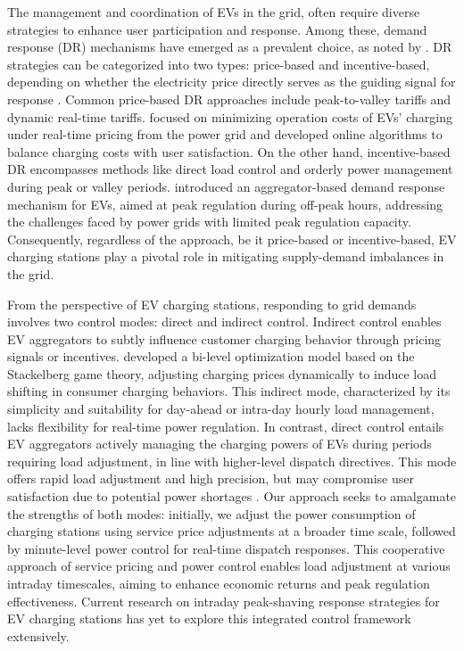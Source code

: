 \documentclass[preprint,12pt]{elsarticle}
\begin{document}
The management and coordination of  EVs in the grid, often require diverse strategies to enhance user participation and response. Among these, demand response (DR) mechanisms have emerged
as a prevalent choice, as noted by \citet{Mohandes_Demand_Response}. DR strategies can be categorized into two types: price-based and incentive-based, depending on whether the electricity price directly serves as the guiding signal for response \citep{FANShuai2022}. Common price-based
DR approaches include peak-to-valley tariffs and dynamic real-time tariffs. \citet{lin_minimizing_2022} focused on minimizing operation costs of EVs' charging under real-time pricing from the power grid and developed online algorithms to balance charging
costs with user satisfaction. On the other hand, incentive-based DR encompasses methods like direct load control and orderly power management during peak or valley periods. \citet{fang_aggregator-based_2020} introduced an aggregator-based demand response mechanism for EVs, aimed at peak regulation during off-peak hours, addressing the challenges faced by power grids with limited peak regulation capacity. Consequently, regardless of the approach, be it price-based or incentive-based,
EV charging stations play a pivotal role in mitigating supply-demand imbalances in the grid.

From the perspective of EV charging stations, responding to grid demands
involves two control modes: direct and indirect control. Indirect
control enables EV aggregators to subtly influence customer charging
behavior through pricing signals or incentives. \citet{2021A} developed a bi-level optimization model based on the Stackelberg game theory, adjusting charging prices dynamically to induce load shifting in consumer charging behaviors. This indirect mode, characterized by its simplicity and suitability for day-ahead or intra-day hourly load management, lacks flexibility for real-time power regulation. In contrast, direct control entails EV aggregators
actively managing the charging powers of EVs during periods requiring
load adjustment, in line with higher-level dispatch directives. This
mode offers rapid load adjustment and high precision, but may compromise
user satisfaction due to potential power shortages \citep{2017Real}.
Our approach seeks to amalgamate the strengths of both modes: initially,
we adjust the power consumption of charging stations using service
price adjustments at a broader time scale, followed by minute-level
power control for real-time dispatch responses. This cooperative approach
of service pricing and power control enables load adjustment at various
intraday timescales, aiming to enhance economic returns and peak regulation
effectiveness. Current research on intraday peak-shaving response
strategies for EV charging stations has yet to explore this integrated
control framework extensively.
\end{document}
